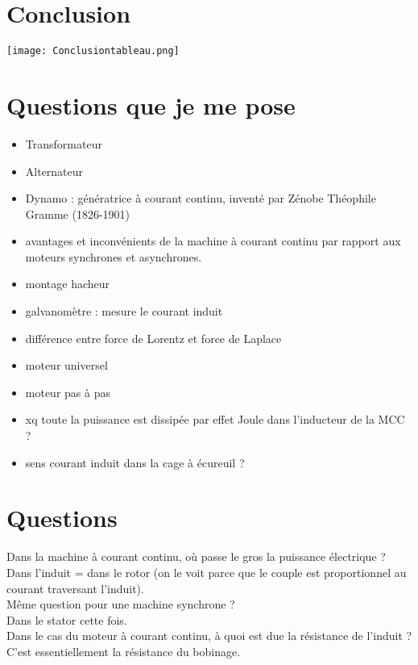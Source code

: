 \documentclass[12pt,prb,aps,epsf]{article}
\begin{document}
\section*{Conclusion}

\begin{center}
    \texttt{[image: Conclusiontableau.png]}
\end{center}

\section*{Questions que je me pose}
\begin{itemize}
    \item Transformateur
    \item Alternateur
    \item Dynamo : génératrice à courant continu, inventé par Zénobe Théophile Gramme (1826-1901)
    \item avantages et inconvénients de la machine à courant continu par rapport aux moteurs synchrones et asynchrones.
    \item montage hacheur
    \item galvanomètre : mesure le courant induit
    \item différence entre force de Lorentz et force de Laplace
    \item moteur universel
    \item moteur pas à pas
    \item xq toute la puissance est dissipée par effet Joule dans l'inducteur de la MCC ? 
    \item sens courant induit dans la cage à écureuil ? 
\end{itemize}

\section*{Questions}
Dans la machine à courant continu, où passe le gros la puissance électrique ?\\
Dans l'induit = dans le rotor (on le voit parce que le couple est proportionnel au courant traversant l'induit).\\

Même question pour une machine synchrone ?\\
Dans le stator cette fois.\\

Dans le cas du moteur à courant continu, à quoi est due la résistance de l'induit ?\\
C'est essentiellement la résistance du bobinage.\\
\end{document}
